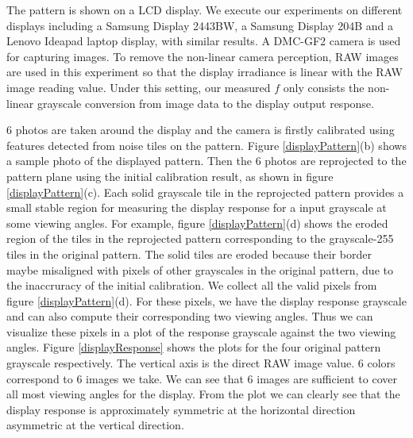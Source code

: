 \documentclass{report}
\begin{document}
The pattern is shown on a LCD display. We execute our experiments on different displays including a Samsung Display 2443BW, a Samsung Display 204B and a Lenovo Ideapad laptop display, with similar results. A DMC-GF2 camera is used for capturing images. To remove the non-linear camera perception, RAW images are used in this experiment so that the display irradiance is linear with the RAW image reading value. Under this setting, our measured $f$ only consists the non-linear grayscale conversion from image data to the display output response. 

6 photos are taken around the display and the camera is firstly calibrated using features detected from noise tiles on the pattern. Figure \ref{displayPattern}(b) shows a sample photo of the displayed pattern. Then the 6 photos are reprojected to the pattern plane using the initial calibration result, as shown in figure \ref{displayPattern}(c). Each solid grayscale tile 	in the reprojected pattern provides a small stable region for measuring the display response for a input grayscale at some viewing angles. For example, figure \ref{displayPattern}(d) shows the eroded region of the tiles in the reprojected pattern corresponding to the grayscale-255 tiles in the original pattern. The solid tiles are eroded because their border maybe misaligned with pixels of other grayscales in the original pattern, due to the inaccruracy of the initial calibration. We collect all the valid pixels from figure \ref{displayPattern}(d). For these pixels, we have the display response grayscale and can also compute their corresponding two viewing angles. Thus we can visualize these pixels in a plot of the response grayscale against the two viewing angles. Figure \ref{displayResponse} shows the plots for the four original pattern grayscale respectively. The vertical axis is the direct RAW image value. 6 colors correspond to 6 images we take. We can see that 6 images are sufficient to cover all most viewing angles for the display. From the plot we can clearly see that the display response is approximately symmetric at the horizontal direction asymmetric at the vertical direction. 
\end{document}
